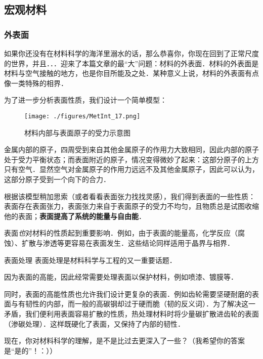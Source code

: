 \subsection{宏观材料}
\subsubsection{外表面}
如果你还没有在材料科学的海洋里溺水的话，那么恭喜你，你现在回到了正常尺度的世界，并且．．．迎来了本篇文章的最“大”问题：材料的外表面．材料的外表面是材料与空气接触的地方，也是你目所能及之处．某种意义上说，材料的外表面有点像一类特殊的相界．

为了进一步分析表面性质，我们设计一个简单模型：
\begin{figure}[ht]
\centering
\texttt{[image: ./figures/MetInt\_17.png]}
\caption{材料内部与表面原子的受力示意图} \label{MetInt_fig17}
\end{figure}
金属内部的原子，四周受到来自其他金属原子的作用力大致相同，因此内部的原子处于受力平衡状态；而表面附近的原子，情况变得微妙了起来：这部分原子的上方只有空气．显然空气对金属原子的作用力远远不及其他金属原子，因此可以认为，这部分原子受到一个向下的合力．

根据该模型稍加思索（或者看看表面张力找找灵感），我们得到表面的一些性质：表面存在表面张力，表面张力来自于表面原子的受力不均匀，且物质总是试图收缩他的表面；\textbf{表面提高了系统的能量与自由能}．

表面\textsl{也}对材料的性质起到重要影响．例如，由于表面的能量高，化学反应（腐蚀）、扩散与渗透等更容易在表面发生．这些结论同样适用于晶界与相界．

\begin{example}{表面处理}
表面处理是材料科学与工程的又一重要话题．

因为表面的高能，因此经常需要处理表面以保护材料，例如喷漆、镀膜等．

同时，表面的高能性质也允许我们设计更复杂的表面．例如齿轮需要坚硬耐磨的表面与有韧性的内部，而一般的高碳钢却过于硬而脆（韧的反义词）．为了解决这一矛盾，我们便利用表面容易扩散的性质，热处理材料时将少量碳扩散进齿轮的表面（渗碳处理）．这样既硬化了表面，又保持了内部的韧性．
\end{example}

现在，你对材料科学的理解，是不是比过去更深入了一些？（我希望你的答案是“是的”！：））
